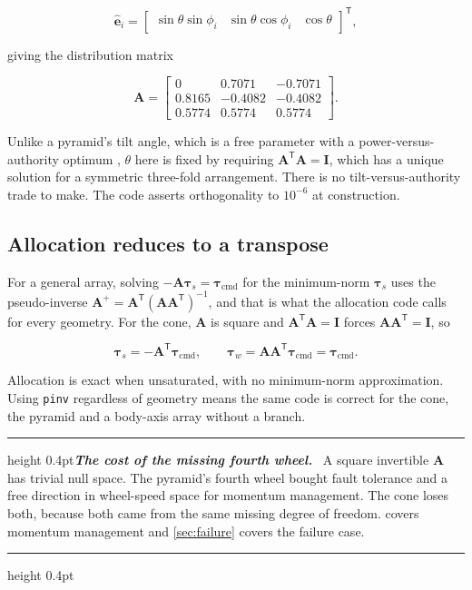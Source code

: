 \documentclass[conference,10pt,a4paper]{IEEEtran}
\newcommand{\remarkrule}{\par\nobreak\vspace{2pt}%
  \hrule height 0.4pt\vspace{4pt}\nobreak}
\newenvironment{keybox}[1][Result]
  {\par\medskip\remarkrule\noindent\small\textbf{\textit{#1.}}\ \ignorespaces}
  {\par\vspace{3pt}\hrule height 0.4pt\par\medskip\ignorespacesafterend}
\newcommand{\vect}[1]{\bm{#1}}
\newcommand{\mat}[1]{\bm{#1}}
\newcommand{\T}{^{\mathsf{T}}}
\newcommand{\pinv}{^{+}}
\begin{document}
\begin{equation}
\hat{\vect{e}}_i = \begin{bmatrix}
\sin\theta\sin\phi_i & \sin\theta\cos\phi_i & \cos\theta\end{bmatrix}\T,
\label{eq:Amatrix}
\end{equation}

giving the distribution matrix

\begin{equation}
\mat{A} =
\begin{bmatrix}
0 & 0.7071 & -0.7071\\
0.8165 & -0.4082 & -0.4082\\
0.5774 & 0.5774 & 0.5774
\end{bmatrix}.
\label{eq:Amatrix_num}
\end{equation}

Unlike a pyramid's tilt angle, which is a free parameter with a
power-versus-authority optimum \cite{shirazi2014}, $\theta$ here is fixed by
requiring $\mat{A}\T\mat{A}=\mat{I}$, which has a unique solution for a
symmetric three-fold arrangement. There is no tilt-versus-authority trade to
make. The code asserts orthogonality to $10^{-6}$ at construction.

\subsection{Allocation reduces to a transpose}

For a general array, solving $-\mat{A}\vect{\tau}_s=\vect{\tau}_\text{cmd}$ for
the minimum-norm $\vect{\tau}_s$ uses the pseudo-inverse
$\mat{A}\pinv=\mat{A}\T(\mat{A}\mat{A}\T)^{-1}$, and that is what the
allocation code calls for every geometry. For the cone, $\mat{A}$ is square
and $\mat{A}\T\mat{A}=\mat{I}$ forces $\mat{A}\mat{A}\T=\mat{I}$, so

\begin{equation}
\vect{\tau}_s = -\mat{A}\T\vect{\tau}_\text{cmd},
\qquad
\vect{\tau}_w = \mat{A}\mat{A}\T\vect{\tau}_\text{cmd} = \vect{\tau}_\text{cmd}.
\label{eq:allocation}
\end{equation}

Allocation is exact when unsaturated, with no minimum-norm approximation. Using
\texttt{pinv} regardless of geometry means the same code is correct for the
cone, the pyramid and a body-axis array without a branch.

\begin{keybox}[The cost of the missing fourth wheel]
A square invertible $\mat{A}$ has trivial null space. The pyramid's fourth
wheel bought fault tolerance and a free direction in wheel-speed space for
momentum management. The cone loses both, because both came from the same
missing degree of freedom.  covers momentum management and
\cref{sec:failure} covers the failure case.
\end{keybox}
\end{document}
